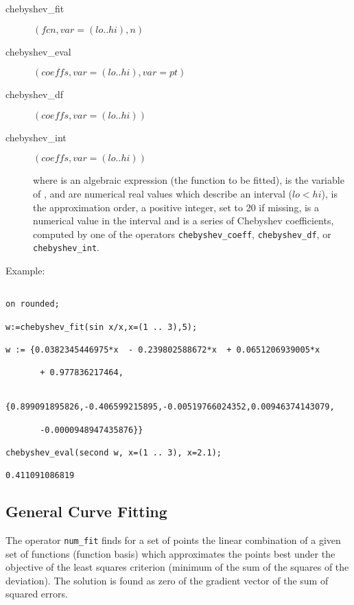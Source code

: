 \begin{description}
\item[chebyshev\_fit] $(fcn,var=(lo .. hi),n)$

\item[chebyshev\_eval] $(coeffs,var=(lo .. hi),var=pt)$

\item[chebyshev\_df] $(coeffs,var=(lo .. hi))$

\item[chebyshev\_int] $(coeffs,var=(lo .. hi))$

where  is an algebraic expression (the function to be
fitted),  is the variable of ,  and  are
numerical real values which describe an interval ($lo < hi$),
 is the approximation order, a positive integer, set to 20 if missing,
 is a numerical value in the interval and  is
a series of Chebyshev coefficients, computed by one of the operators
\texttt{chebyshev\_coeff}, \texttt{chebyshev\_df}, or \texttt{chebyshev\_int}.
\end{description}

Example:

\begin{verbatim}

on rounded;

w:=chebyshev_fit(sin x/x,x=(1 .. 3),5);

w := {0.0382345446975*x  - 0.239802588672*x  + 0.0651206939005*x

       + 0.977836217464,

      {0.899091895826,-0.406599215895,-0.00519766024352,0.00946374143079,

       -0.0000948947435876}}

chebyshev_eval(second w, x=(1 .. 3), x=2.1);

0.411091086819

\end{verbatim}

\subsection{General Curve Fitting}
\hypertarget{operator:NUM_FIT}{}

The operator \texttt{num\_fit} finds for a set of
points the linear combination of a given set of
functions (function basis) which approximates the
points best under the objective of the least squares
criterion (minimum of the sum of the squares of the deviation).
The solution is found as zero of the
gradient vector of the sum of squared errors.

